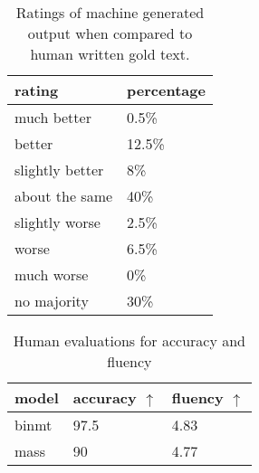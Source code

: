 \documentclass[11pt,a4paper]{article}
\begin{document}
\begin{table}[]
\centering
\begin{tabular}{l|l}
\hline
  rating             &   percentage     \\ \hline
 much better     & 0.5\%  \\
 better          & 12.5\% \\
 slightly better & 8\%    \\
 about the same  & 40\%  \\ 
 slightly worse  & 2.5\%  \\ 
 worse           & 6.5\%  \\ 
 much worse      & 0\%    \\
 no majority     & 30\%  \\ \hline
\end{tabular}
\caption{Ratings of machine generated output when compared to human written gold text.}
\end{table}



\begin{table}[]
\centering
\begin{tabular}{l|l|l}
\hline
model & accuracy $\uparrow$ & fluency $\uparrow$ \\ \hline
binmt & 97.5     & 4.83    \\ 
mass  & 90       & 4.77    \\ \hline
\end{tabular}
\caption{Human evaluations for accuracy and fluency}
\label{results-human}
\end{table}
\end{document}
